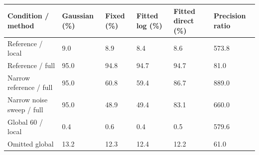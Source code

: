 \begin{tabular}{llllll}
\hline
Condition / method & Gaussian (\%) & Fixed (\%) & Fitted log (\%) & Fitted direct (\%) & Precision ratio \\
\hline
Reference / local & 9.0 & 8.9 & 8.4 & 8.6 & 573.8 \\
Reference / full & 95.0 & 94.8 & 94.7 & 94.7 & 81.0 \\
Narrow reference / full & 95.0 & 60.8 & 59.4 & 86.7 & 889.0 \\
Narrow noise sweep / full & 95.0 & 48.9 & 49.4 & 83.1 & 660.0 \\
Global 60 / local & 0.4 & 0.6 & 0.4 & 0.5 & 579.6 \\
Omitted global & 13.2 & 12.3 & 12.4 & 12.2 & 61.0 \\
\hline
\end{tabular}
